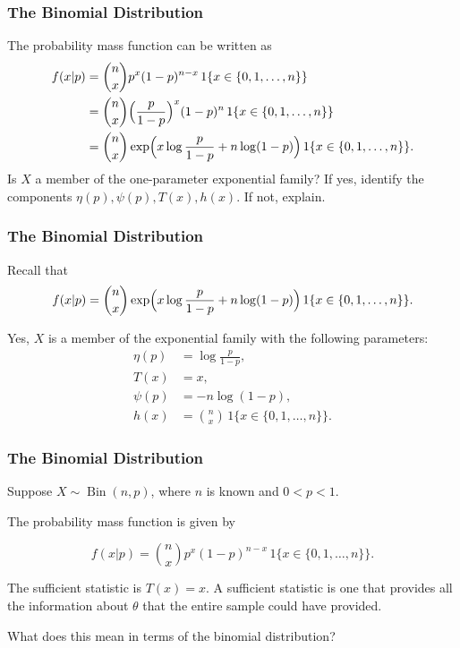 \documentclass{beamer}
\begin{document}
\begin{frame}
\frametitle{The Binomial Distribution}
The probability mass function can be written as
\begin{align}
f(x|p) &= \binom{n}{x} p^x (1-p)^{n-x} \, 1\{x \in \{0,1,\dots,n\}\} \\
&=  \binom{n}{x}  \Big(\frac{p}{1-p}\Big)^x (1-p)^n \, 1\{x \in \{0,1,\dots,n\}\} \\
& = \binom{n}{x} \exp\Bigl( x\log\frac{p}{1-p} + n\log(1-p) \Bigr) \, 1\{x \in \{0,1,\dots,n\}\}.
\end{align}
Is $X$ a member of the one-parameter exponential family? If yes, identify the components $\eta(p), \psi(p), T(x), h(x).$ If not, explain. 
\end{frame}



\begin{frame}
\frametitle{The Binomial Distribution}

Recall that $$ f(x|p) = \binom{n}{x} \exp\Bigl( x\log\frac{p}{1-p} + n\log(1-p) \Bigr) \, 1\{x \in \{0,1,\dots,n\}\}.$$

Yes, $X$ is a member of the exponential family with the following parameters:
\begin{align*}
\eta(p) &= \log\frac{p}{1-p},\\[1mm]
T(x) &= x,\\[1mm]
\psi(p) &= -n\log(1-p),\\[1mm]
h(x) &= \binom{n}{x}\, 1\{x \in \{0,1,\dots,n\}\}.
\end{align*}
\end{frame}

\begin{frame}
\frametitle{The Binomial Distribution}
Suppose $X \sim \operatorname{Bin}(n,p)$, where $n$ is known and $0 < p < 1$.

The probability mass function is given by 

$$f(x|p) = \binom{n}{x} p^x (1-p)^{n-x} \, 1\{x \in \{0,1,\dots,n\}\}.$$
\vspace*{1em}

The sufficient statistic is $T(x) = x.$ A sufficient statistic is one that provides all the information about $\theta$ that the entire sample could have provided. 
\vspace*{1em}

What does this mean in terms of the binomial distribution?
\end{frame}
\end{document}
